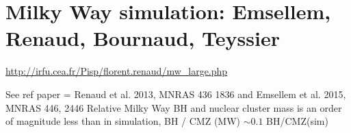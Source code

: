 \section{Milky Way simulation: Emsellem, Renaud, Bournaud, Teyssier}

\url{http://irfu.cea.fr/Pisp/florent.renaud/mw_large.php}

See ref paper = Renaud et al. 2013, MNRAS 436 1836
and Emsellem et al. 2015, MNRAS 446, 2446
Relative Milky Way BH and nuclear cluster mass is an order of magnitude less than in simulation, BH / CMZ (MW) $\sim0.1$ BH/CMZ(sim)